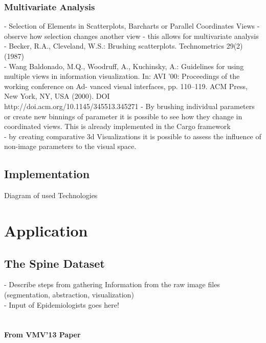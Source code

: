 \documentclass[journal]{style/vgtc}           %
\begin{document}
\subsubsection{Multivariate Analysis}
- Selection of Elements in Scatterplots, Barcharts or Parallel Coordinates Views - observe how selection changes another view - this allows for multivariate analysis\\
- Becker, R.A., Cleveland, W.S.: Brushing scatterplots. Technometrics 29(2) (1987)\\
- Wang Baldonado, M.Q., Woodruff, A., Kuchinsky, A.: Guidelines for using multiple views in information visualization. In: AVI ’00: Proceedings of the working conference on Ad- vanced visual interfaces, pp. 110–119. ACM Press, New York, NY, USA (2000). DOI\\ http://doi.acm.org/10.1145/345513.345271
- By brushing individual parameters or create new binnings of parameter it is possible to see how they change in coordinated views. This is already implemented in the Cargo framework\\
- by creating comparative 3d Visualizations it is possible to assess the influence of non-image parameters to the visual space.

\subsection{Implementation}
Diagram of used Technologies

\section{Application}

\subsection{The Spine Dataset}
- Describe steps from gathering Information from the raw image files (segmentation, abstraction, visualization)\\
- Input of Epidemiologists goes here!\\
\\\\
\textbf{From VMV'13 Paper}\\
\end{document}
